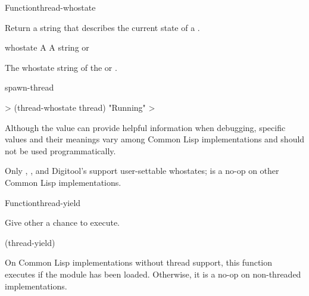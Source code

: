 \begin{functiondoc}{Function}{thread-whostate}{
   \returns{} } 

\fnsyntax

\fnpurpose Return a string that describes the current state of a 
.

\fnsetf
{}%
  {}{}

\fnpackage {}

\fnmodule {}

\fnargs
\begin{args}{whostate}
\arg[thread] A 
\arg[whostate] A string or \nil{}
\end{args}

\fnreturns The whostate string of the  or \nil.

\fnerrors
\nothreads{}

\begin{alsos}{spawn-thread}
\end{alsos}

\fnexample
%
\W\supp
\begin{example}
  > (thread-whostate thread)
  "Running"
  >
\end{example}

\fnnote Although the  value can provide helpful information
when debugging, specific  values and their meanings
vary among Common Lisp implementations and should not be used
programmatically.

Only , , and Digitool's  support user-settable whostates;
 is a no-op on other Common Lisp
implementations.

\end{functiondoc}


\begin{functiondoc}{Function}{thread-yield}{\noargs{}}
%
%

\fnsyntax

\fnpurpose Give other  a chance to execute.

\fnpackage {}

\fnmodule {}

\fnexample
%
\W\supp
\begin{example}
  (thread-yield)
\end{example}

\fnnote On Common Lisp implementations without thread support, this function
executes  if the
 module has been loaded.  Otherwise, it is a
no-op on non-threaded implementations.

\end{functiondoc}

